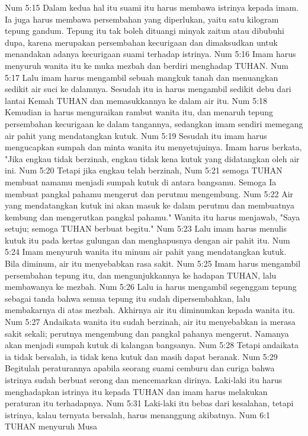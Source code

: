 Num 5:15  Dalam kedua hal itu suami itu harus membawa istrinya kepada imam. Ia juga harus membawa persembahan yang diperlukan, yaitu satu kilogram tepung gandum. Tepung itu tak boleh dituangi minyak zaitun atau dibubuhi dupa, karena merupakan persembahan kecurigaan dan dimaksudkan untuk menandakan adanya kecurigaan suami terhadap istrinya.
Num 5:16  Imam harus menyuruh wanita itu ke muka mezbah dan berdiri menghadap TUHAN.
Num 5:17  Lalu imam harus mengambil sebuah mangkuk tanah dan menuangkan sedikit air suci ke dalamnya. Sesudah itu ia harus mengambil sedikit debu dari lantai Kemah TUHAN dan memasukkannya ke dalam air itu.
Num 5:18  Kemudian ia harus menguraikan rambut wanita itu, dan menaruh tepung persembahan kecurigaan ke dalam tangannya, sedangkan imam sendiri memegang air pahit yang mendatangkan kutuk.
Num 5:19  Sesudah itu imam harus mengucapkan sumpah dan minta wanita itu menyetujuinya. Imam harus berkata, "Jika engkau tidak berzinah, engkau tidak kena kutuk yang didatangkan oleh air ini.
Num 5:20  Tetapi jika engkau telah berzinah,
Num 5:21  semoga TUHAN membuat namamu menjadi sumpah kutuk di antara bangsamu. Semoga Ia membuat pangkal pahamu mengerut dan perutmu mengembung.
Num 5:22  Air yang mendatangkan kutuk ini akan masuk ke dalam perutmu dan membuatnya kembung dan mengerutkan pangkal pahamu." Wanita itu harus menjawab, "Saya setuju; semoga TUHAN berbuat begitu."
Num 5:23  Lalu imam harus menulis kutuk itu pada kertas gulungan dan menghapusnya dengan air pahit itu.
Num 5:24  Imam menyuruh wanita itu minum air pahit yang mendatangkan kutuk. Bila diminum, air itu menyebabkan rasa sakit.
Num 5:25  Imam harus mengambil persembahan tepung itu, dan mengunjukkannya ke hadapan TUHAN, lalu membawanya ke mezbah.
Num 5:26  Lalu ia harus mengambil segenggam tepung sebagai tanda bahwa semua tepung itu sudah dipersembahkan, lalu membakarnya di atas mezbah. Akhirnya air itu diminumkan kepada wanita itu.
Num 5:27  Andaikata wanita itu sudah berzinah, air itu menyebabkan ia merasa sakit sekali; perutnya mengembung dan pangkal pahanya mengerut. Namanya akan menjadi sumpah kutuk di kalangan bangsanya.
Num 5:28  Tetapi andaikata ia tidak bersalah, ia tidak kena kutuk dan masih dapat beranak.
Num 5:29  Begitulah peraturannya apabila seorang suami cemburu dan curiga bahwa istrinya sudah berbuat serong dan mencemarkan dirinya. Laki-laki itu harus menghadapkan istrinya itu kepada TUHAN dan imam harus melakukan peraturan itu terhadapnya.
Num 5:31  Laki-laki itu bebas dari kesalahan, tetapi istrinya, kalau ternyata bersalah, harus menanggung akibatnya.
Num 6:1  TUHAN menyuruh Musa
